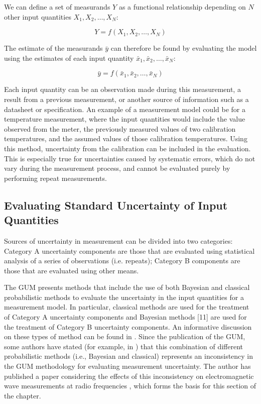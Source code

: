 \documentclass[../thesis/thesis.tex]{subfiles}
\begin{document}
\begin{refsection}
We can define a set of measurands $Y$ as a functional relationship depending on $N$ other input quantities $X_1, X_2, \dots, X_N$:

\begin{equation}
Y=f(X_1,X_2,\dots,X_N)
\end{equation}

The estimate of the measurands $\bar{y}$ can therefore be found by evaluating the model using the estimates of each input quantity $\bar{x}_1,\bar{x}_2,…,\bar{x}_N$:

\begin{equation}
\bar{y}=f(\bar{x}_1,\bar{x}_2,…,\bar{x}_N)
\end{equation}

Each input quantity can be an observation made during this measurement, a result from a previous measurement, or another source of information such as a datasheet or specification. An example of a measurement model could be for a temperature measurement, where the input quantities would include the value observed from the meter, the previously measured values of two calibration temperatures, and the assumed values of those calibration temperatures. Using this method, uncertainty from the calibration can be included in the evaluation. This is especially true for uncertainties caused by systematic errors, which do not vary during the measurement process, and cannot be evaluated purely by performing repeat measurements.

\subsection{Evaluating Standard Uncertainty of Input Quantities}

Sources of uncertainty in measurement can be divided into two categories: Category A uncertainty components are those that are evaluated using statistical analysis of a series of observations (i.e. repeats); Category B components are those that are evaluated using other means.

The GUM presents methods that include the use of both Bayesian and classical probabilistic methods to evaluate the uncertainty in the input quantities for a measurement model. In particular, classical methods \cite{Neyman_1937} are used for the treatment of Category A uncertainty components and Bayesian methods [11] are used for the treatment of Category B uncertainty components. An informative discussion on these types of method can be found in \cite{White_2016}. Since the publication of the GUM, some authors have stated (for example, in \cite{Kacker_2006,Kacker_2005,Kacker_2003,Bich_2014}) that this combination of different probabilistic methods (i.e., Bayesian and classical) represents an inconsistency in the GUM methodology for evaluating measurement uncertainty. The author has published a paper considering the effects of this inconsistency on electromagnetic wave measurements at radio frequencies \cite{Stant_2016}, which forms the basis for this section of the chapter.


\end{refsection}
\end{document}
